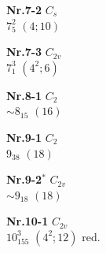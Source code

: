 \documentclass[12pt]{article}
\begin{document}
{\begin{minipage}[t]{3.5cm}
{{\bf Nr.7-2} \quad $C_{s}$\\ $7^2_{5}$ \quad $(4;10)$\\\vspace{3mm} }
\end{minipage}
\setlength{\unitlength}{1cm}
\begin{minipage}[t]{3.5cm}
\centering
\epsfxsize=2.5cm
\par
{{\bf Nr.7-3} \quad $C_{2v}$\\ $7^3_1$ \quad $(4^2;6)$\\\vspace{3mm} }
\end{minipage}
\setlength{\unitlength}{1cm}
\begin{minipage}[t]{3.5cm}
\centering
\epsfxsize=2.5cm
\par
{{\bf Nr.8-1} \quad $C_{2}$\\ $\sim 8_{15}$ \quad $(16)$\\\vspace{3mm} }
\end{minipage}
\setlength{\unitlength}{1cm}
\begin{minipage}[t]{3.5cm}
\centering
\epsfxsize=2.5cm
\par
{{\bf Nr.9-1} \quad $C_{2}$\\ $9_{38}$ \quad $(18)$\\\vspace{3mm} }
\end{minipage}
\setlength{\unitlength}{1cm}
\begin{minipage}[t]{3.5cm}
\centering
\epsfxsize=2.5cm
\par
{{\bf Nr.9-2${}^*$} \quad $C_{2v}$\\ $\sim 9_{18}$ \quad $(18)$\\\vspace{3mm} }
\end{minipage}
\setlength{\unitlength}{1cm}
\begin{minipage}[t]{3.5cm}
\centering
\epsfxsize=2.5cm
\par
{{\bf Nr.10-1} \quad $C_{2v}$\\ $10^3_{155}$ \quad $(4^2;12)$ red.\\\vspace{3mm} }
\end{minipage}
\setlength{\unitlength}{1cm}
\begin{minipage}[t]{3.5cm}
\centering
\epsfxsize=2.5cm

\end{minipage}}
\end{document}
